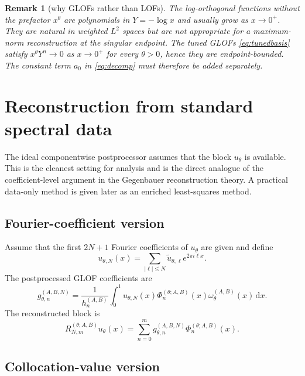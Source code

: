 \documentclass[11pt]{article}
\newtheorem{remark}{Remark}
\newcommand{\dd}{\,\mathrm{d}}
\begin{document}
\begin{remark}[why GLOFs rather than LOFs]
The log-orthogonal functions without the prefactor $x^\theta$ are polynomials in $Y=-\log x$ and usually grow as $x\to0^+$.  They are natural in weighted $L^2$ spaces but are not appropriate for a maximum-norm reconstruction at the singular endpoint.  The tuned GLOFs \eqref{eq:tunedbasis} satisfy $x^\theta Y^n\to0$ as $x\to0^+$ for every $\theta>0$, hence they are endpoint-bounded.  The constant term $a_0$ in \eqref{eq:decomp} must therefore be added separately.
\end{remark}

\section{Reconstruction from standard spectral data}

The ideal componentwise postprocessor assumes that the block $u_\theta$ is available.  This is the cleanest setting for analysis and is the direct analogue of the coefficient-level argument in the Gegenbauer reconstruction theory.  A practical data-only method is given later as an enriched least-squares method.

\subsection{Fourier-coefficient version}

Assume that the first $2N+1$ Fourier coefficients of $u_\theta$ are given and define
\begin{equation}\label{eq:fourier-partial}
    u_{\theta,N}(x)=\sum_{|\ell|\le N}\widetilde u_{\theta,\ell}e^{2\pi i\ell x}.
\end{equation}
The postprocessed GLOF coefficients are
\begin{equation}\label{eq:fourier-gcoef}
    g_{\theta,n}^{(A,B,N)}
    =\frac{1}{h_n^{(A,B)}}
    \int_0^1
    u_{\theta,N}(x)\Phi_n^{(\theta;A,B)}(x)
    \omega_\theta^{(A,B)}(x)\dd x .
\end{equation}
The reconstructed block is
\begin{equation}\label{eq:fourier-recon}
    R_{N,m}^{(\theta;A,B)}u_\theta(x)
    =\sum_{n=0}^{m} g_{\theta,n}^{(A,B,N)}\Phi_n^{(\theta;A,B)}(x).
\end{equation}

\subsection{Collocation-value version}
\end{document}
